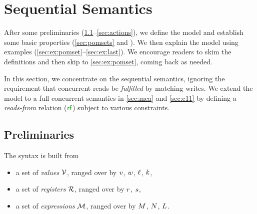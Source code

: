 \section{Sequential Semantics}
\label{sec:model}

After some preliminaries (\textsection\ref{sec:prelim}--\ref{sec:actions}),
we define the model and establish some basic properties
(\textsection\ref{sec:pomsets} and ).  We then explain the
model using examples (\textsection\ref{sec:ex:pomset}--\ref{sec:ex:last}).
We encourage readers to skim the definitions and then skip to
\textsection\ref{sec:ex:pomset}, coming back as needed.

In this section, we concentrate on the sequential semantics, ignoring the
requirement that concurrent reads be \emph{fulfilled} by matching writes. We
extend the model to a full concurrent semantics in \textsection\ref{sec:mca}
and \textsection\ref{sec:c11} by defining a \emph{reads-from} relation ($\rrfx$) subject
to various constraints.




\subsection{Preliminaries}
\label{sec:prelim}
The syntax is built from
\begin{itemize}
\item a set of \emph{values}
  $\mathcal{V}$, ranged over by $v$, $w$, $\ell$, $k$,
\item a set of \emph{registers} $\mathcal{R}$, ranged over by
  $r$, $s$,
\item a set of \emph{expressions} $\mathcal{M}$, ranged over by
  $M$, $N$,  $L$.
\end{itemize}

